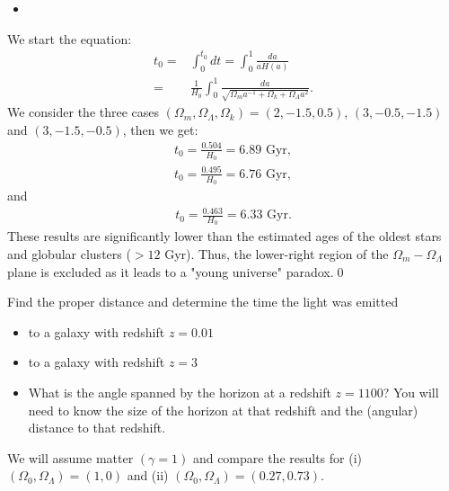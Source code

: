 \begin{itemize}
    \item [(c)]
\end{itemize}
We start the equation:
\begin{align}
    t_0 =& \int_0^{t_0} dt=\int_0^1 \frac{da}{a H(a)}\\
    =&\frac{1}{H_0}\int_0^1 \frac{da}{\sqrt{\Omega_m a^{-1}+\Omega_k +\Omega_\Lambda a^2}}.
\end{align}
We consider the three cases $(\Omega_m,\Omega_\Lambda,\Omega_k)=(2,-1.5,0.5)$, $(3,-0.5,-1.5)$ and $(3,-1.5,-0.5)$, then we get:
\begin{align}
    t_0 = \frac{0.504}{H_0}=6.89 \text{ Gyr},
\end{align}
\begin{align}
    t_0=\frac{0.495}{H_0}=6.76 \text{ Gyr},
\end{align}
and 
\begin{align}
    t_0=\frac{0.463}{H_0}=6.33 \text{ Gyr}.
\end{align}
These results are significantly lower than the estimated ages of the oldest stars and globular clusters ($> 12$ Gyr). Thus, the lower-right region of the $\Omega_m - \Omega_\Lambda$ plane is excluded as it leads to a "young universe" paradox.\qed








\clearpage
{}
Find the proper distance and determine the time the light was emitted
\begin{itemize}
    \item [(a)] to a galaxy with redshift $z=0.01$
    \item [(b)] to a galaxy with redshift $z=3$
    \item [(c)] What is the angle spanned by the horizon at a redshift $z=1100$? You will need to know the size of the horizon at that redshift and the (angular) distance to that redshift.
\end{itemize}
We will assume matter $(\gamma=1)$ and compare the results for (i) $(\Omega_0,\Omega_\Lambda)=(1,0)$ and (ii) $(\Omega_0,\Omega_\Lambda)=(0.27,0.73)$.

